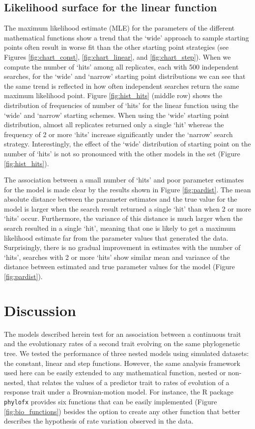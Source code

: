 \subsection{Likelihood surface for the linear function}

The maximum likelihood estimate (MLE) for the parameters of the different mathematical functions show a trend that the `wide' approach to sample starting points often result in worse fit than the other starting point strategies (see Figures \ref{fig:chart_const}, \ref{fig:chart_linear}, and \ref{fig:chart_step}). When we compute the number of `hits' among all replicates, each with 500 independent searches, for the `wide' and `narrow' starting point distributions we can see that the same trend is reflected in how often independent searches return the same maximum likelihood point. Figure \ref{fig:hist_hits} (middle row) shows the distribution of frequencies of number of `hits' for the linear function using the `wide' and `narrow' starting schemes. When using the `wide' starting point distribution, almost all replicates returned only a single `hit' whereas the frequency of 2 or more `hits' increase significantly under the `narrow' search strategy. Interestingly, the effect of the `wide' distribution of starting point on the number of `hits' is not so pronounced with the other models in the set (Figure \ref{fig:hist_hits}).

The association between a small number of `hits' and poor parameter estimates for the model is made clear by the results shown in Figure \ref{fig:pardist}. The mean absolute distance between the parameter estimates and the true value for the model is larger when the search result returned a single `hit' than when 2 or more `hits' occur. Furthermore, the variance of this distance is much larger when the search resulted in a single `hit', meaning that one is likely to get a maximum likelihood estimate far from the parameter values that generated the data. Surprisingly, there is no gradual improvement in estimates with the number of `hits', searches with 2 or more `hits' show similar mean and variance of the distance between estimated and true parameter values for the model (Figure \ref{fig:pardist}).

\section{Discussion}

The models described herein test for an association between a continuous trait and the evolutionary rates of a second trait evolving on the same phylogenetic tree. We tested the performance of three nested models using simulated datasets: the constant, linear and step functions. However, the same analysis framework used here can be easily extended to any mathematical function, nested or non-nested, that relates the values of a predictor trait to rates of evolution of a response trait under a Brownian-motion model. For instance, the R package \texttt{phylofx} provides six functions that can be easily implemented (Figure \ref{fig:bio_functions}) besides the option to create any other function that better describes the hypothesis of rate variation observed in the data.

